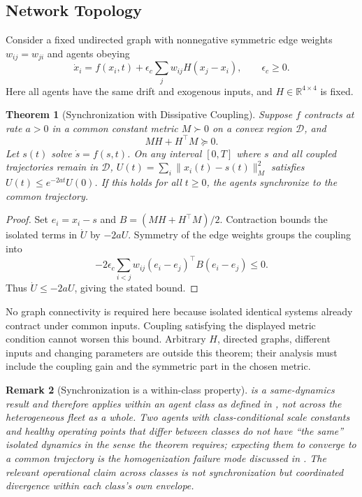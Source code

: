 \documentclass[11pt,twocolumn]{article}
\newtheorem{theorem}{Theorem}[section]
\newtheorem{remark}[theorem]{Remark}
\begin{document}
\subsection{Network Topology}

Consider a fixed undirected graph with nonnegative symmetric edge
weights $w_{ij}=w_{ji}$ and agents obeying
\begin{equation}
 \dot x_i=f(x_i,t)+\epsilon_c\sum_j w_{ij}H(x_j-x_i),
 \qquad \epsilon_c\ge0.
 \label{eq:network}
\end{equation}
Here all agents have the same drift and exogenous inputs, and
$H\in\mathbb R^{4\times4}$ is fixed.

\begin{theorem}[Synchronization with Dissipative Coupling]
\label{thm:network}
Suppose $f$ contracts at rate $a>0$ in a common constant metric
$M\succ0$ on a convex region $\mathcal D$, and
\begin{equation}
 MH+H^\top M\succeq0.
 \label{eq:sync-condition}
\end{equation}
Let $s(t)$ solve $\dot s=f(s,t)$. On any interval $[0,T]$ where $s$ and
all coupled trajectories remain in $\mathcal D$,
$U(t)=\sum_i\|x_i(t)-s(t)\|_M^2$ satisfies
$U(t)\le e^{-2at}U(0)$. If this holds for all $t\ge0$, the
agents synchronize to the common trajectory.
\end{theorem}
\begin{proof}
Set $e_i=x_i-s$ and $B=(MH+H^\top M)/2$. Contraction bounds
the isolated terms in $\dot U$ by $-2aU$. Symmetry of the edge
weights groups the coupling into
\[
 -2\epsilon_c\sum_{i<j}w_{ij}(e_i-e_j)^\top B(e_i-e_j)\le0.
\]
Thus $\dot U\le-2aU$, giving the stated bound.
\end{proof}
No graph connectivity is required here because isolated identical
systems already contract under common inputs. Coupling satisfying
the displayed metric condition cannot worsen this bound. Arbitrary
$H$, directed graphs, different inputs and changing parameters are
outside this theorem; their analysis must include the coupling gain
and the symmetric part in the chosen metric.

\begin{remark}[Synchronization is a within-class property]
 is a same-dynamics result and therefore applies
within an agent class as defined in , not
across the heterogeneous fleet as a whole. Two agents with
class-conditional scale constants and healthy operating points that
differ between classes do not have ``the same'' isolated dynamics in
the sense the theorem requires; expecting them to converge to a
common trajectory is the homogenization failure mode discussed in
. The relevant operational claim across
classes is not synchronization but coordinated divergence within each
class's own envelope.
\end{remark}
\end{document}
